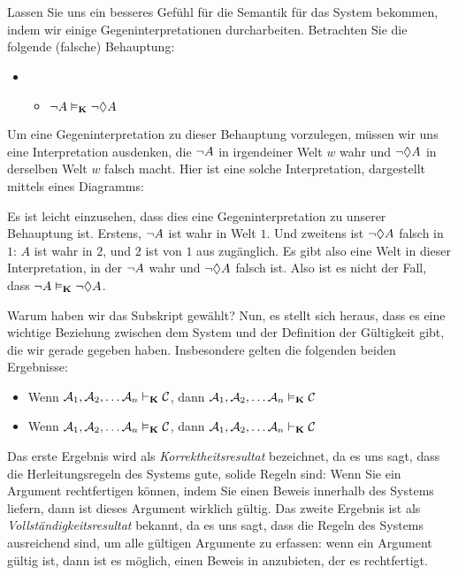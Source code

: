 Lassen Sie uns ein besseres Gefühl für die Semantik für das System \mlK{} bekommen, indem wir einige Gegeninterpretationen durcharbeiten. Betrachten Sie die folgende (falsche) Behauptung:
\begin{itemize}
	\item[]
	\begin{itemize}
		\item[]$\neg A\vDash_{\mathbf{K}} \neg \Diamond A$
	\end{itemize}
\end{itemize}
Um eine Gegeninterpretation zu dieser Behauptung vorzulegen, müssen wir uns eine Interpretation ausdenken, die $\neg A$ in irgendeiner Welt $w$ wahr und $\neg\Diamond A$ in derselben Welt $w$ falsch macht. Hier ist eine solche Interpretation, dargestellt mittels eines Diagramms:
\begin{center}
\end{center}
Es ist leicht einzusehen, dass dies eine Gegeninterpretation zu unserer Behauptung ist. Erstens, $\neg A$ ist wahr in Welt $1$. Und zweitens ist $\neg\Diamond A$ falsch in $1$: $A$ ist wahr in $2$, und $2$ ist von $1$ aus zugänglich. Es gibt also eine Welt in dieser Interpretation, in der $\neg A$ wahr und $\neg\Diamond A$ falsch ist. Also ist es nicht der Fall, dass $\neg A\vDash_{\mathbf{K}}\neg\Diamond A$.

Warum haben wir das Subskript \mlK{} gewählt? Nun, es stellt sich heraus, dass es eine wichtige Beziehung zwischen dem System \mlK{} und der Definition der Gültigkeit gibt, die wir gerade gegeben haben. Insbesondere gelten die folgenden beiden Ergebnisse:
\begin{itemize}
	\item Wenn $\mathcal{A}_1,\mathcal{A}_2, \dots \mathcal{A}_n\vdash_{\mathbf{K}}\mathcal{C}$, dann $\mathcal{A}_1,\mathcal{A}_2, \dots \mathcal{A}_n\vDash_{\mathbf{K}}\mathcal{C}$
	\item Wenn $\mathcal{A}_1,\mathcal{A}_2, \dots \mathcal{A}_n\vDash_{\mathbf{K}}\mathcal{C}$, dann $\mathcal{A}_1,\mathcal{A}_2, \dots \mathcal{A}_n\vdash_{\mathbf{K}}\mathcal{C}$
\end{itemize}
Das erste Ergebnis wird als \emph{Korrektheitsresultat} bezeichnet, da es uns sagt, dass die Herleitungsregeln des Systems \mlK{} gute, solide Regeln sind: Wenn Sie ein Argument rechtfertigen können, indem Sie einen Beweis innerhalb des Systems \mlK{} liefern, dann ist dieses Argument wirklich gültig. Das zweite Ergebnis ist als \emph{Vollständigkeitsresultat} bekannt, da es uns sagt, dass die Regeln des Systems \mlK{} ausreichend sind, um alle gültigen Argumente zu erfassen: wenn ein Argument gültig ist, dann ist es möglich, einen Beweis in \mlK{} anzubieten, der es rechtfertigt.

